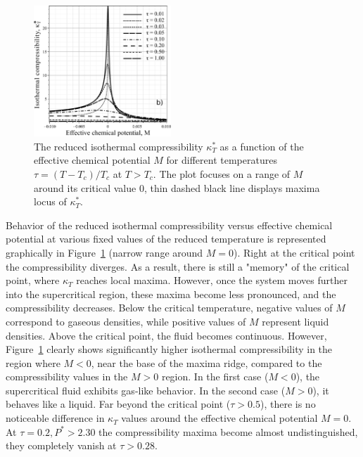 \begin{figure}[h!] 
	\centering \includegraphics[width=0.46\textwidth]{f3bb.pdf}
	\vskip-3mm
	\caption{The reduced isothermal compressibility $\kappa^*_T$ as a function of the effective chemical potential $M$ for different temperatures $\tau = (T - T_c)/T_c$ at $T > T_c$. The plot focuses on a range of $M$ around its critical value $0$, thin dashed black line displays maxima locus of $\kappa^*_T$.
	}
	\label{fig3}
\end{figure}
Behavior of the reduced isothermal compressibility versus effective chemical potential at various fixed values of the reduced temperature is represented graphically in Figure~\ref{fig3} (narrow range around $M=0$). Right at the critical point the compressibility diverges. As a result, there is still a "memory" of the critical point, where $\kappa_T$ reaches local maxima. However, once the system moves further into the supercritical region, these maxima become less pronounced, and the compressibility decreases. 
Below the critical temperature, negative values of $M$ correspond to gaseous densities, while positive values of $M$ represent liquid densities. Above the critical point, the fluid becomes continuous. However, Figure~\ref{fig3} clearly shows significantly higher isothermal compressibility in the region where $M<0$, near the base of the maxima ridge, compared to the compressibility values in the $M>0$ region. In the first case ($M<0$), the supercritical fluid exhibits gas-like behavior. In the second case ($M>0$), it behaves like a liquid. Far beyond the critical point ($\tau > 0.5$), there is no noticeable difference in $\kappa_T$ values around the effective chemical potential $M=0$. At $\tau = 0.2, P^*>2.30$ the compressibility maxima become almost undistinguished, they completely vanish at $\tau > 0.28$. 
